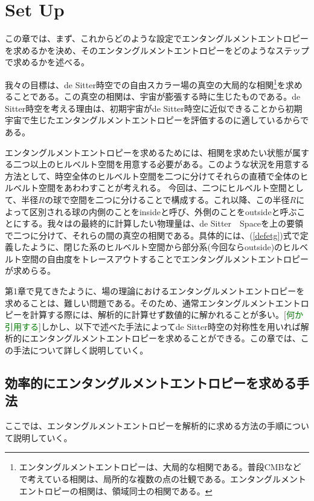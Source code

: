 \section{Set Up}

この章では、まず、これからどのような設定でエンタングルメントエントロピーを求めるかを決め、そのエンタングルメントエントロピーをどのようなステップで求めるかを述べる。


我々の目標は、de Sitter時空での自由スカラー場の真空の大局的な相関\footnote{エンタングルメントエントロピーは、大局的な相関である。普段CMBなどで考えている相関は、局所的な複数の点の壮観である。エンタングルメントエントロピーの相関は、領域同士の相関である。}を求めることである。この真空の相関は、宇宙が膨張する時に生じたものである。de Sitter時空を考える理由は、初期宇宙がde Sitter時空に近似できることから初期宇宙で生じたエンタングルメントエントロピーを評価するのに適しているからである。

エンタングルメントエントロピーを求めるためには、相関を求めたい状態が属する二つ以上のヒルベルト空間を用意する必要がある。このような状況を用意する方法として、時空全体のヒルベルト空間を二つに分けてそれらの直積で全体のヒルベルト空間をあわわすことが考えれる。
今回は、二つにヒルベルト空間として、半径$R$の球で空間を二つに分けることで構成する。これ以降、この半径$R$によって区別される球の内側のことをinsideと呼び、外側のことをoutsideと呼ぶことにする。我々はの最終的に計算したい物理量は、de Sitter　Spaceを上の要領で二つに分けて、それらの間の真空の相関である。具体的には、(\ref{defetg})式で定義したように、閉じた系のヒルベルト空間から部分系(今回ならoutside)のヒルベルト空間の自由度をトレースアウトすることでエンタングルメントエントロピーが求めらる。


第1章で見てきたように、場の理論におけるエンタングルメントエントロピーを求めることは、難しい問題である。そのため、通常エンタングルメントエントロピーを計算する際には、解析的に計算せず数値的に解かれることが多い。[\textcolor{green}{何か引用する}]しかし、以下で述べた手法によってde Sitter時空の対称性を用いれば解析的にエンタングルメントエントロピーを求めることができる。この章では、この手法について詳しく説明していく。

\subsection{効率的にエンタングルメントエントロピーを求める手法}
ここでは、エンタングルメントエントロピーを解析的に求める方法の手順について説明していく。

